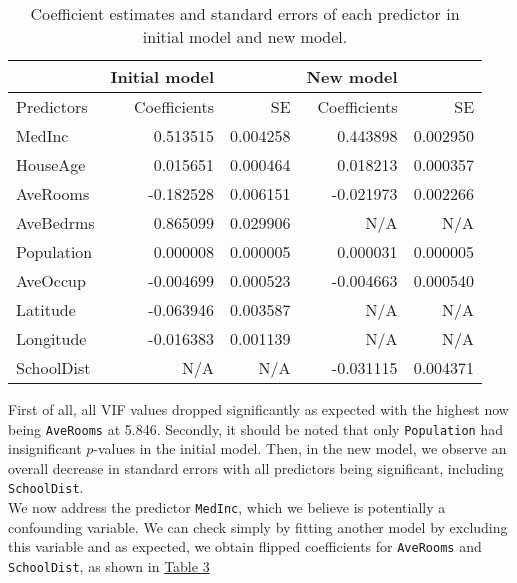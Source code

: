 \documentclass[12pt]{article}
\begin{document}
	\begin{table}[h]
		\centering
		\begin{tabular}{|l|rr|rr|}
			\hline
			& Initial model & & New model & \\
			\hline
			Predictors & Coefficients & SE & Coefficients & SE \\[2pt]
			\hline
			MedInc & 0.513515 &  0.004258 & 0.443898 & 0.002950 \\[2pt]
			
			HouseAge & 0.015651 & 0.000464 & 0.018213 &  0.000357 \\[2pt]
			
			AveRooms & -0.182528 &  0.006151 & -0.021973 & 0.002266  \\[2pt]
			
			AveBedrms & 0.865099 &  0.029906 & N/A  & N/A \\[2pt]
			
			Population & 0.000008  & 0.000005 & 0.000031 &  0.000005 \\[2pt]
			
			AveOccup & -0.004699  & 0.000523 & -0.004663 & 0.000540 \\[2pt]
			
			Latitude & -0.063946 & 0.003587 & N/A  & N/A \\[2pt]
			
			Longitude & -0.016383 & 0.001139 & N/A & N/A \\[2pt]
			
			SchoolDist & N/A & N/A &-0.031115 & 0.004371 \\[2pt]
			\hline
		\end{tabular}       
		\label{tab:Table2}
		\caption{Coefficient estimates and standard errors of each predictor in initial model and new model.}
	\end{table}
	
	First of all, all VIF values dropped significantly as expected with the highest now being \texttt{AveRooms} at 5.846. Secondly, it should be noted that only \texttt{Population} had insignificant $p$-values in the initial model. Then, in the new model, we observe an overall decrease in standard errors with all predictors being significant, including \texttt{SchoolDist}.\\
	
	We now address the predictor \texttt{MedInc}, which we believe is potentially a confounding variable. We can check simply by fitting another model by excluding this variable and as expected, we obtain flipped coefficients for \texttt{AveRooms} and \texttt{SchoolDist}, as shown in \hyperref[tab:Table3]{Table 3} \\
	
\end{document}
